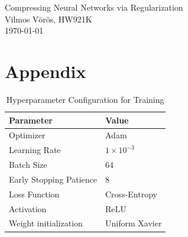 \documentclass[12pt]{article}
\begin{document}
\pagestyle{fancy}

\begin{titlepage} 
    \centering
    \vspace*{\fill}
    
    {\large Compressing Neural Networks via Regularization} \\[2cm]
    {Vilmos Vörös, HW921K} \\[1cm]
    {\today}

    \vspace*{\fill}

\end{titlepage} 

\tableofcontents

\pagebreak













\appendix
\section{Appendix}\label{sec:appendix}
\begin{table}[h]
\centering
\caption{Hyperparameter Configuration for Training}
\label{tab:training_params}
\begin{tabular}{ll}
\toprule
\textbf{Parameter} & \textbf{Value} \\
\midrule
Optimizer & Adam \\
Learning Rate & $1 \times 10^{-3}$ \\
Batch Size & 64 \\
Early Stopping Patience & 8 \\
Loss Function & Cross-Entropy \\
Activation & ReLU \\
Weight initialization & Uniform Xavier \\
\bottomrule
\end{tabular}
\end{table}
\end{document}
